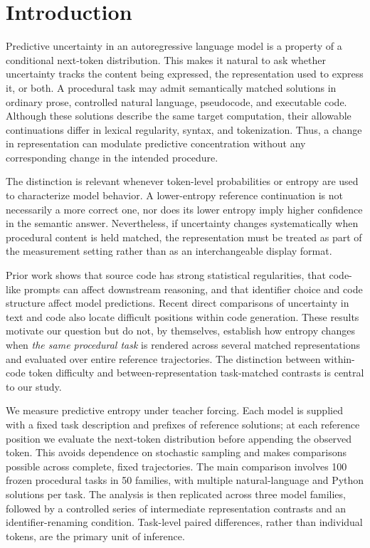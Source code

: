 \documentclass[sn-mathphys-num]{sn-jnl}
\begin{document}
\section{Introduction}

Predictive uncertainty in an autoregressive language model is a property of a conditional next-token distribution. This makes it natural to ask whether uncertainty tracks the content being expressed, the representation used to express it, or both. A procedural task may admit semantically matched solutions in ordinary prose, controlled natural language, pseudocode, and executable code. Although these solutions describe the same target computation, their allowable continuations differ in lexical regularity, syntax, and tokenization. Thus, a change in representation can modulate predictive concentration without any corresponding change in the intended procedure.

The distinction is relevant whenever token-level probabilities or entropy are used to characterize model behavior. A lower-entropy reference continuation is not necessarily a more correct one, nor does its lower entropy imply higher confidence in the semantic answer. Nevertheless, if uncertainty changes systematically when procedural content is held matched, the representation must be treated as part of the measurement setting rather than as an interchangeable display format.

Prior work shows that source code has strong statistical regularities, that code-like prompts can affect downstream reasoning, and that identifier choice and code structure affect model predictions. Recent direct comparisons of uncertainty in text and code also locate difficult positions within code generation. These results motivate our question but do not, by themselves, establish how entropy changes when \emph{the same procedural task} is rendered across several matched representations and evaluated over entire reference trajectories. The distinction between within-code token difficulty and between-representation task-matched contrasts is central to our study.

We measure predictive entropy under teacher forcing. Each model is supplied with a fixed task description and prefixes of reference solutions; at each reference position we evaluate the next-token distribution before appending the observed token. This avoids dependence on stochastic sampling and makes comparisons possible across complete, fixed trajectories. The main comparison involves 100 frozen procedural tasks in 50 families, with multiple natural-language and Python solutions per task. The analysis is then replicated across three model families, followed by a controlled series of intermediate representation contrasts and an identifier-renaming condition. Task-level paired differences, rather than individual tokens, are the primary unit of inference.
\end{document}

